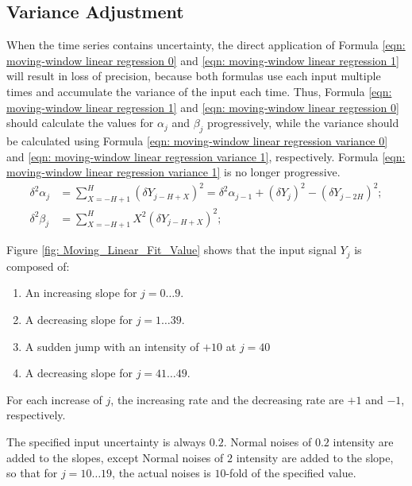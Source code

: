 \documentclass[twoside]{article}
\numberwithin{equation}{section}
\begin{document}
\subsection{Variance Adjustment} 

When the time series contains uncertainty, the direct application of Formula \eqref{eqn: moving-window linear regression 0} and \eqref{eqn: moving-window linear regression 1} will result in loss of precision, because both formulas use each input multiple times and accumulate the variance of the input each time.
Thus, Formula \eqref{eqn: moving-window linear regression 1} and \eqref{eqn: moving-window linear regression 0} should calculate the values for $\alpha_j$ and $\beta_j$ progressively, while the variance should be calculated using Formula \eqref{eqn: moving-window linear regression variance 0} and \eqref{eqn: moving-window linear regression variance 1}, respectively.
Formula \eqref{eqn: moving-window linear regression variance 1} is no longer progressive.
\begin{align}
\label{eqn: moving-window linear regression variance 0}
\delta^2 \alpha_{j} &= \sum_{X=-H+1}^{H} (\delta Y_{j-H+X})^2 = \delta^2 \alpha_{j-1} + (\delta Y_{j})^2 - (\delta Y_{j-2H})^2; \\
\label{eqn: moving-window linear regression variance 1}
\delta^2 \beta_{j} &= \sum_{X=-H+1}^{H} X^2 (\delta Y_{j-H+X})^2;
\end{align}

Figure \ref{fig: Moving_Linear_Fit_Value} shows that the input signal $Y_j$ is composed of:
\begin{enumerate}
\item An increasing slope for $j = 0 \dots 9$.

\item A decreasing slope for $j = 1 \dots 39$.

\item A sudden jump with an intensity of $+10$ at $j=40$

\item A decreasing slope for $j = 41 \dots 49$.
\end{enumerate}
For each increase of $j$, the increasing rate and the decreasing rate are $+1$ and $-1$, respectively.

The specified input uncertainty is always $0.2$.
Normal noises of $0.2$ intensity are added to the slopes, except Normal noises of $2$ intensity are added to the slope, so that for $j = 10 \dots 19$, the actual noises is $10$-fold of the specified value.
\end{document}
